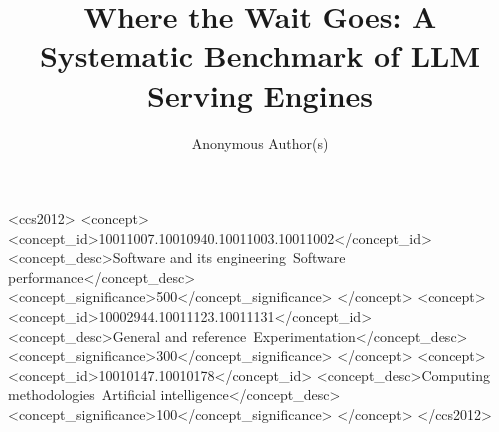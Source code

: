 \documentclass[sigconf,review,anonymous]{acmart}
\begin{document}
\title[Where the Wait Goes]{Where the Wait Goes: A Systematic Benchmark of LLM Serving Engines}

\author{Anonymous Author(s)}



\begin{CCSXML}
<ccs2012>
   <concept>
       <concept_id>10011007.10010940.10011003.10011002</concept_id>
       <concept_desc>Software and its engineering~Software performance</concept_desc>
       <concept_significance>500</concept_significance>
   </concept>
   <concept>
       <concept_id>10002944.10011123.10011131</concept_id>
       <concept_desc>General and reference~Experimentation</concept_desc>
       <concept_significance>300</concept_significance>
   </concept>
   <concept>
       <concept_id>10010147.10010178</concept_id>
       <concept_desc>Computing methodologies~Artificial intelligence</concept_desc>
       <concept_significance>100</concept_significance>
   </concept>
</ccs2012>
\end{CCSXML}


\maketitle











\begin{acks}
\end{acks}



\end{document}
